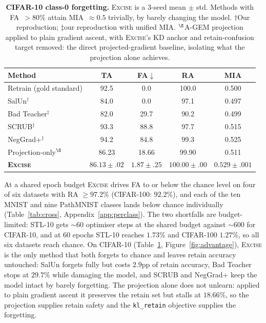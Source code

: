 \documentclass{article}
\newcommand{\ours}{\textsc{Excise}}
\newcommand{\klr}{\texttt{kl\_retain}}
\theoremstyle{remark}
\theoremstyle{plain}
\begin{document}
\begin{table}[t]
\centering
\caption{\textbf{CIFAR-10 class-0 forgetting.} \ours{} is a 3-seed mean $\pm$
std. Methods with FA~$>80\%$ attain MIA~$\approx 0.5$ trivially, by barely
changing the model. $\dagger$Our reproduction; $\ddagger$our reproduction with
unified MIA. $^\S$A-GEM projection applied to plain gradient ascent, with
\ours{}'s KD anchor and retain-confusion target removed: the direct
projected-gradient baseline, isolating what the projection alone achieves.}
\label{tab:cifar10}
\begin{tabular}{@{}lcccc@{}}
\toprule
\textbf{Method} & \textbf{TA} & \textbf{FA}$\downarrow$ & \textbf{RA} & \textbf{MIA} \\
\midrule
Retrain (gold standard) & 92.5 & 0.0 & 100.0 & 0.500 \\
\midrule
SalUn$^\dagger$        & 84.0 & 0.0  & 97.1 & 0.497 \\
Bad Teacher$^\ddagger$ & 82.0 & 29.7 & 90.2 & 0.499 \\
SCRUB$^\ddagger$       & 93.3 & 88.8 & 97.7 & 0.515 \\
NegGrad+$^\ddagger$    & 94.2 & 84.8 & 99.3 & 0.525 \\
\midrule
Projection-only$^\S$   & 86.23 & 18.66 & 99.90 & 0.511 \\
\midrule
\textbf{\ours{}} & $\mathbf{86.13}\pm.02$ & $\mathbf{1.87}\pm.25$ & $\mathbf{100.00}\pm.00$ & $\mathbf{0.529}\pm.001$ \\
\bottomrule
\end{tabular}
\end{table}

At a shared epoch budget \ours{} drives FA to or below the chance level on four
of six datasets with RA $\ge 97.2\%$ (CIFAR-100: $92.2\%$), and each of the ten
MNIST and nine PathMNIST classes lands below chance individually
(Table~\ref{tab:cross}, Appendix~\ref{app:perclass}). The two shortfalls are
budget-limited: STL-10 gets ${\sim}60$ optimiser steps at the shared budget
against ${\sim}600$ for CIFAR-10, and at 60 epochs STL-10 reaches $1.73\%$ and
CIFAR-100 $1.27\%$, so all six datasets reach chance. On CIFAR-10
(Table~\ref{tab:cifar10}, Figure~\ref{fig:advantage}), \ours{} is the only method that both forgets to chance
and leaves retain accuracy untouched: SalUn forgets fully but costs $2.9$pp of
retain accuracy, Bad Teacher stops at $29.7\%$ while damaging the model, and
SCRUB and NegGrad+ keep the model intact by barely forgetting. The projection
alone does not unlearn: applied to plain gradient ascent it preserves the retain
set but stalls at $18.66\%$, so the projection supplies retain safety and the
\klr{} objective supplies the forgetting.
\end{document}
